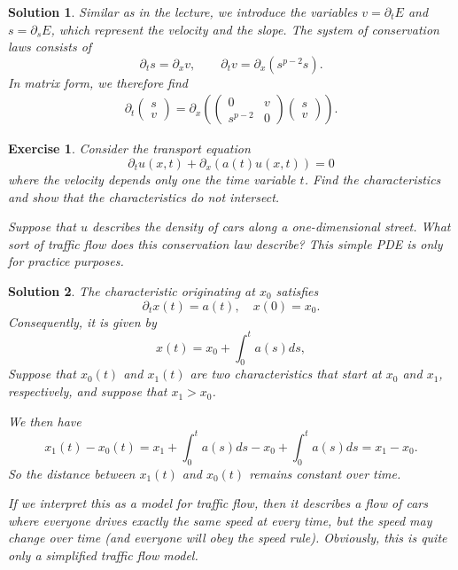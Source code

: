 \documentclass[10pt,letterpaper]{article}
\theoremstyle{break}
\newtheorem{exercise}{Exercise}
\newtheorem{mysolution}{Solution}
\newenvironment{solution}{\begin{mysolution}}{\end{mysolution}}
\begin{document}
\begin{solution}
    Similar as in the lecture, we introduce the variables $v = \partial_t E$ and $s = \partial_s E$, which represent the velocity and the slope.
    The system of conservation laws consists of 
    $$
        \partial_t s = \partial_x v,
        \qquad
        \partial_t v = \partial_x \left( s^{p-2} s \right).
    $$
    In matrix form, we therefore find 
    \begin{align*}
        \partial_{t}
        \begin{pmatrix}
         s \\ v
        \end{pmatrix}
        =
        \partial_{x}
        \left( 
        \begin{pmatrix}
            0 & v
            \\
            s^{p-2} & 0
        \end{pmatrix}
        \begin{pmatrix}
         s \\ v
        \end{pmatrix}
        \right)
        .
    \end{align*}

\end{solution}




\begin{exercise}
    Consider the transport equation 
    $$
        \partial_t u(x,t) + \partial_x\left( a(t) u(x,t) \right) = 0
    $$
    where the velocity depends only one the time variable $t$.
    Find the characteristics and show that the characteristics do not intersect.
    
    Suppose that $u$ describes the density of cars along a one-dimensional street. What sort of traffic flow does this conservation law describe?
    \textit{This simple PDE is only for practice purposes.}
\end{exercise}

\begin{solution}
    The characteristic originating at $x_0$ satisfies 
    $$
        \partial_t x(t) = a(t), \quad x(0) = x_0.
    $$
    Consequently, it is given by 
    $$
        x(t) = x_0 + \int_0^t a(s) ds,
    $$
    Suppose that $x_0(t)$ and $x_1(t)$ are two characteristics that start at $x_0$ and $x_1$, respectively, and suppose that $x_1 > x_0$.

    We then have 
    $$
        x_1(t) - x_0(t)
        =
        x_1 + \int_0^t a(s) ds - x_0 + \int_0^t a(s) ds
        =
        x_1 - x_0
        .
    $$
    So the distance between $x_1(t)$ and $x_0(t)$ remains constant over time.
    
    If we interpret this as a model for traffic flow, 
    then it describes a flow of cars where everyone drives exactly the same speed at every time,
    but the speed may change over time (and everyone will obey the speed rule).
    Obviously, this is quite only a simplified traffic flow model. 
\end{solution}
\end{document}
